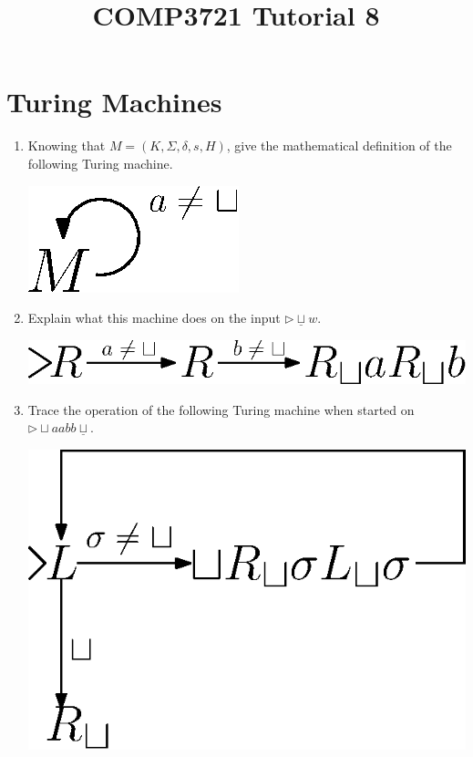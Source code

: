 \documentclass[a4paper]{article}
\date{}
\author{}
\title{COMP3721 Tutorial 8}
\theoremstyle{definition}
\numberwithin{equation}{subsection}
\begin{document}
\maketitle
\section{Turing Machines}
\begin{enumerate}[Q1.]
\item Knowing that $M = (K,\Sigma, \delta, s, H)$, give the mathematical definition of the following Turing machine.
\begin{center}
\includegraphics[scale = 0.6]{q1.eps}
\end{center} 

\item Explain what this machine does on the input $\triangleright\underline{\sqcup} w$.
\begin{center}
\includegraphics[scale = 0.6]{q2.eps}
\end{center} 

\item Trace the operation of the following Turing machine when started on $\triangleright{\sqcup} aabb\underline{\sqcup}$.
\begin{center}
\includegraphics[scale = 0.6]{q3.eps}
\end{center}
\end{enumerate}
\end{document}
